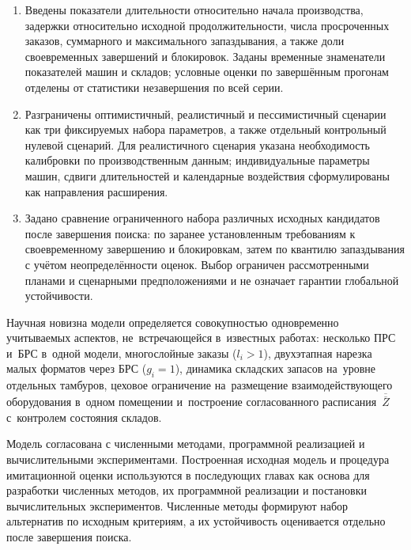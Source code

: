\begin{enumerate}
    \item Введены показатели длительности относительно начала производства, задержки относительно исходной продолжительности, числа просроченных заказов, суммарного и максимального запаздывания, а также доли своевременных завершений и блокировок. Заданы временные знаменатели показателей машин и складов; условные оценки по завершённым прогонам отделены от статистики незавершения по всей серии.
    \item Разграничены оптимистичный, реалистичный и пессимистичный сценарии как три фиксируемых набора параметров, а также отдельный контрольный нулевой сценарий. Для реалистичного сценария указана необходимость калибровки по производственным данным; индивидуальные параметры машин, сдвиги длительностей и календарные воздействия сформулированы как направления расширения.
    \item Задано сравнение ограниченного набора различных исходных кандидатов после завершения поиска: по заранее установленным требованиям к своевременному завершению и блокировкам, затем по квантилю запаздывания с учётом неопределённости оценок. Выбор ограничен рассмотренными планами и сценарными предположениями и не означает гарантии глобальной устойчивости.
\end{enumerate}

Научная новизна модели определяется совокупностью одновременно учитываемых аспектов, не~встречающейся в~известных работах: несколько ПРС и~БРС в~одной модели, многослойные заказы ($l_i>1$), двухэтапная нарезка малых форматов через БРС ($g_i=1$), динамика складских запасов на~уровне отдельных тамбуров, цеховое ограничение на~размещение взаимодействующего оборудования в~одном помещении и~построение согласованного расписания~$\overline{\overline{Z}}$ с~контролем состояния складов.

Модель согласована с численными методами, программной реализацией и вычислительными экспериментами. Построенная исходная модель и процедура имитационной оценки используются в последующих главах как основа для разработки численных методов, их программной реализации и постановки вычислительных экспериментов. Численные методы формируют набор альтернатив по исходным критериям, а их устойчивость оценивается отдельно после завершения поиска.

\FloatBarrier
